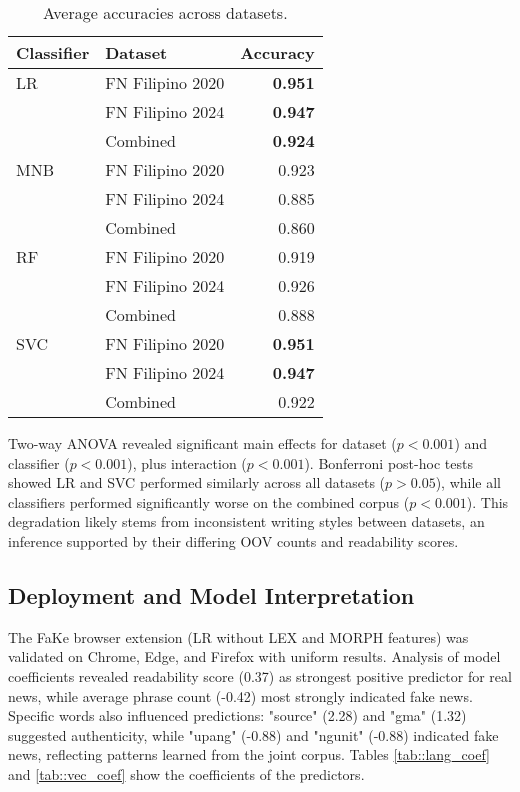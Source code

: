 \documentclass[conference]{IEEEtran}
\begin{document}
\begin{table}[!t]
\centering
\caption{Average accuracies across datasets.}
\label{tab:average_accuracies}
\begin{tabular}{llr}
\hline
\textbf{Classifier} & \textbf{Dataset} & \textbf{Accuracy} \\
\hline
LR & FN Filipino 2020 & \textbf{0.951} \\
 & FN Filipino 2024 & \textbf{0.947} \\
 & Combined & \textbf{0.924} \\
\hline
MNB & FN Filipino 2020 & 0.923 \\
 & FN Filipino 2024 & 0.885 \\
 & Combined & 0.860 \\
\hline
RF & FN Filipino 2020 & 0.919 \\
 & FN Filipino 2024 & 0.926 \\
 & Combined & 0.888 \\
\hline
SVC & FN Filipino 2020 & \textbf{0.951} \\
 & FN Filipino 2024 & \textbf{0.947} \\
 & Combined & 0.922 \\
\hline
\end{tabular}
\end{table}

Two-way ANOVA revealed significant main effects for dataset ($p<0.001$) and classifier ($p<0.001$), plus interaction ($p<0.001$). Bonferroni post-hoc tests showed LR and SVC performed similarly across all datasets ($p>0.05$), while all classifiers performed significantly worse on the combined corpus ($p<0.001$). This degradation likely stems from inconsistent writing styles between datasets, an inference supported by their differing OOV counts and readability scores.

\subsection{Deployment and Model Interpretation}
The FaKe browser extension (LR without LEX and MORPH features) was validated on Chrome, Edge, and Firefox with uniform results. Analysis of model coefficients revealed readability score (0.37) as strongest positive predictor for real news, while average phrase count (-0.42) most strongly indicated fake news. Specific words also influenced predictions: "source" (2.28) and "gma" (1.32) suggested authenticity, while "upang" (-0.88) and "ngunit" (-0.88) indicated fake news, reflecting patterns learned from the joint corpus. Tables \ref{tab::lang_coef} and \ref{tab::vec_coef} show the coefficients of the predictors.
\end{document}

